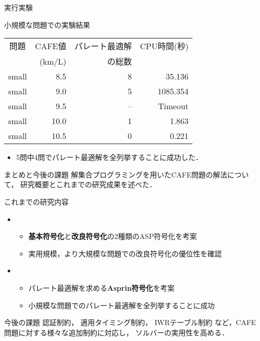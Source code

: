 \documentclass[dvipdfmx, 11pt]{beamer}
\begin{document}
\begin{frame}{実行実験}
 
 \begin{exampleblock}{小規模な問題での実験結果}
  \centering
  \begin{tabular}{c|r|rr}
   問題   & CAFE値  & パレート最適解 & CPU時間(秒) \\
          & (km/L)  & の総数  &  \\ \hline
   small  & 8.5   & 8             & 35.136     \\
   small  & 9.0   & 5             & 1085.354   \\
   small  & 9.5   & --            & Timeout    \\
   small  & 10.0  & 1             & 1.863      \\
   small  & 10.5  & 0             & 0.221      \\ 
  \end{tabular}
 \end{exampleblock}
 \begin{itemize}
  \item 5問中4問でパレート最適解を全列挙することに成功した．
 \end{itemize}
\end{frame}
\begin{frame}{まとめと今後の課題}
 解集合プログラミングを用いたCAFE問題の解法について，
 研究概要とこれまでの研究成果を述べた．
 \begin{block}{これまでの研究内容}
  \begin{itemize}
   \item {}
	 \begin{itemize}
	  \item {\bf 基本符号化}と{\bf 改良符号化}の2種類のASP符号化を考案
	  \item 実用規模，より大規模な問題での改良符号化の優位性を確認
	 \end{itemize}
   \item {}
	 \begin{itemize}
	  \item パレート最適解を求める{\bf Asprin符号化}を考案
	  \item 小規模な問題でのパレート最適解を全列挙することに成功
	 \end{itemize}
  \end{itemize}
 \end{block}
 \begin{alertblock}{今後の課題}
  認証制約，
  適用タイミング制約，
  IWRテーブル制約
  など，CAFE 問題に対する様々な追加制約に対応し，
  ソルバーの実用性を高める．

 \end{alertblock}
\end{frame}
\end{document}

